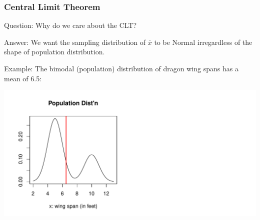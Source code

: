 \documentclass[slides]{beamer}
\newcommand{\blue}[1]{\textcolor{blue2}{#1}}
\newcommand{\xbar}{\overline{x}}
\begin{document}
\begin{frame}
\frametitle{Central Limit Theorem}
\blue{Question}:  Why do we care about the CLT?

\vspace{0.25cm}

\pause\blue{Answer}:  We want the sampling distribution of $\xbar$ to be Normal \blue{irregardless} of the shape of population distribution.

\vspace{0.25cm}

\pause\blue{Example}:  The bimodal (population) distribution of dragon wing spans has a mean of 6.5:

\pause\begin{center}
\includegraphics[width=\textwidth]{figure/CLT1.pdf}
\end{center}

\end{frame}
\end{document}
